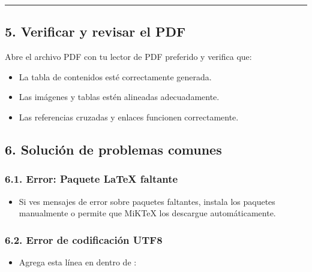 \documentclass[a4paper,10pt,spanish]{sphinxmanual}
\begin{document}
\sphinxAtStartPar
{}


\bigskip\hrule\bigskip



\subsection{5. Verificar y revisar el PDF}
\label{\detokenize{configuracion_inicial/009.Generar_PDF:verificar-y-revisar-el-pdf}}
\sphinxAtStartPar
Abre el archivo PDF con tu lector de PDF preferido y verifica que:
\begin{itemize}
\item {} 
\sphinxAtStartPar
La tabla de contenidos esté correctamente generada.

\item {} 
\sphinxAtStartPar
Las imágenes y tablas estén alineadas adecuadamente.

\item {} 
\sphinxAtStartPar
Las referencias cruzadas y enlaces funcionen correctamente.

\end{itemize}


\subsection{6. Solución de problemas comunes}
\label{\detokenize{configuracion_inicial/009.Generar_PDF:solucion-de-problemas-comunes}}

\subsubsection{6.1. Error: Paquete LaTeX faltante}
\label{\detokenize{configuracion_inicial/009.Generar_PDF:error-paquete-latex-faltante}}\begin{itemize}
\item {} 
\sphinxAtStartPar
Si ves mensajes de error sobre paquetes faltantes, instala los paquetes manualmente o permite que MiKTeX los descargue automáticamente.

\end{itemize}


\subsubsection{6.2. Error de codificación UTF\sphinxhyphen{}8}
\label{\detokenize{configuracion_inicial/009.Generar_PDF:error-de-codificacion-utf-8}}\begin{itemize}
\item {} 
\sphinxAtStartPar
Agrega esta línea en  dentro de :

\begin{sphinxVerbatim}[commandchars=\\\{\}]
  
\end{sphinxVerbatim}

\end{itemize}
\end{document}
